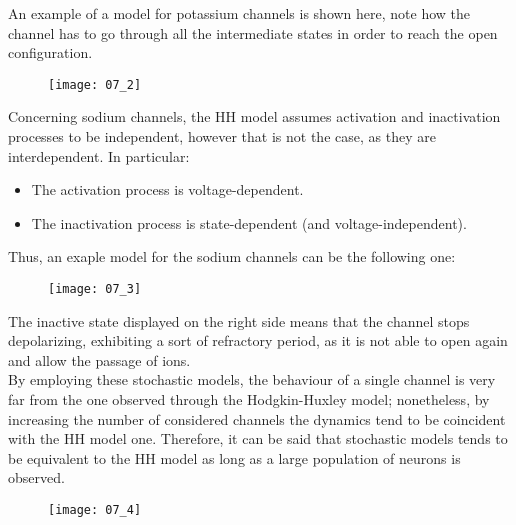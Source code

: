An example of a model for potassium channels is shown here, note how the channel has to go through all
the intermediate states in order to reach the open configuration.
\begin{figure}[H]
    \texttt{[image: 07\_2]}
    \centering
\end{figure}
Concerning sodium channels, the HH model assumes activation and inactivation processes to be independent,
however that is not the case, as they are interdependent. In particular:
\begin{itemize}
    \item The activation process is voltage-dependent.
    \item The inactivation process is state-dependent (and voltage-independent).
\end{itemize}
Thus, an exaple model for the sodium channels can be the following one:
\begin{figure}[H]
    \texttt{[image: 07\_3]}
    \centering
\end{figure}
The inactive state displayed on the right side means that the channel stops depolarizing, exhibiting
a sort of refractory period, as it is not able to open again and allow the passage of ions.\\
By employing these stochastic models, the behaviour of a single channel is very far from the one
observed through the Hodgkin-Huxley model; nonetheless, by increasing the number of considered
channels the dynamics tend to be coincident with the HH model one. Therefore, it can be said
that stochastic models tends to be equivalent to the HH model as long as a large population of
neurons is observed.
\begin{figure}[H]
    \texttt{[image: 07\_4]}
    \centering
\end{figure}
